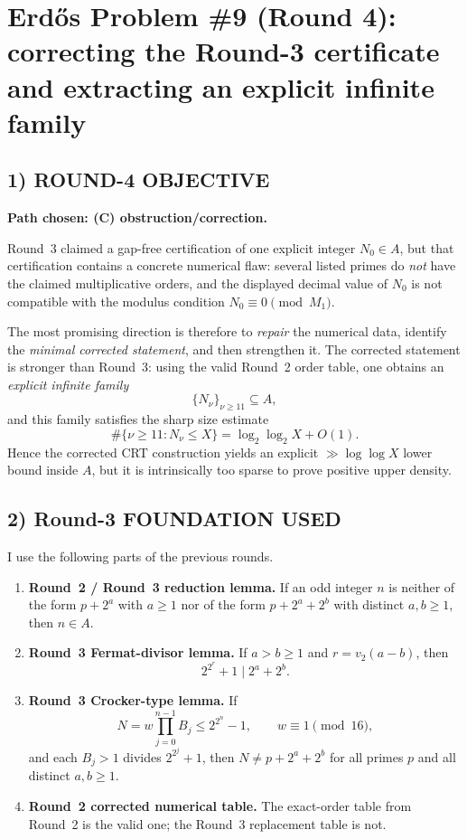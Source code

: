 \section{Erd\H{o}s Problem \#9 (Round 4): correcting the Round-3 certificate and extracting an explicit infinite family}

\subsection*{1) ROUND-4 OBJECTIVE}

\noindent\textbf{Path chosen: (C) obstruction/correction.}

\medskip
Round~3 claimed a gap-free certification of one explicit integer $N_0\in A$, but that certification contains a concrete numerical flaw: several listed primes do \emph{not} have the claimed multiplicative orders, and the displayed decimal value of $N_0$ is not compatible with the modulus condition $N_0\equiv 0\pmod{M_1}$.

The most promising direction is therefore to \emph{repair} the numerical data, identify the \emph{minimal corrected statement}, and then strengthen it.  The corrected statement is stronger than Round~3: using the valid Round~2 order table, one obtains an \emph{explicit infinite family}
\[
\{N_\nu\}_{\nu\ge 11}\subseteq A,
\]
and this family satisfies the sharp size estimate
\[
\#\{\nu\ge 11: N_\nu\le X\}=\log_2\log_2 X+O(1).
\]
Hence the corrected CRT construction yields an explicit $\gg \log\log X$ lower bound inside $A$, but it is intrinsically too sparse to prove positive upper density.

\subsection*{2) Round-3 FOUNDATION USED}

I use the following parts of the previous rounds.

\begin{enumerate}
\item \textbf{Round~2 / Round~3 reduction lemma.} If an odd integer $n$ is neither of the form $p+2^a$ with $a\ge 1$ nor of the form $p+2^a+2^b$ with distinct $a,b\ge 1$, then $n\in A$.
\item \textbf{Round~3 Fermat-divisor lemma.} If $a>b\ge 1$ and $r=v_2(a-b)$, then
\[
2^{2^r}+1\mid 2^a+2^b.
\]
\item \textbf{Round~3 Crocker-type lemma.} If
\[
N=w\prod_{j=0}^{n-1}B_j\le 2^{2^n}-1,\qquad w\equiv 1\pmod{16},
\]
and each $B_j>1$ divides $2^{2^j}+1$, then $N\neq p+2^a+2^b$ for all primes $p$ and all distinct $a,b\ge 1$.
\item \textbf{Round~2 corrected numerical table.} The exact-order table from Round~2 is the valid one; the Round~3 replacement table is not.
\end{enumerate}

